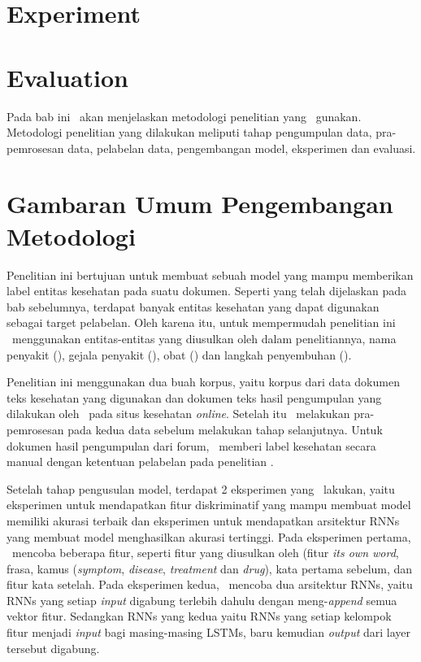 \section{Experiment}

\section{Evaluation}


Pada bab ini \saya~akan menjelaskan metodologi penelitian yang \saya~gunakan. Metodologi penelitian yang dilakukan meliputi tahap pengumpulan data, pra-pemrosesan data, pelabelan data, pengembangan model, eksperimen dan evaluasi.

\section{Gambaran Umum Pengembangan Metodologi}
Penelitian ini bertujuan untuk membuat sebuah model yang mampu memberikan label entitas kesehatan pada suatu dokumen. Seperti yang telah dijelaskan pada bab sebelumnya, terdapat banyak entitas kesehatan yang dapat digunakan sebagai target pelabelan. Oleh karena itu, untuk mempermudah penelitian ini \saya~menggunakan entitas-entitas yang diusulkan oleh \cite{skripsiKakRadit} dalam penelitiannya,  nama penyakit (\textit{\disease}), gejala penyakit (\textit{\symptom}), obat (\textit{\drug}) dan langkah penyembuhan (\textit{\treatment}).

Penelitian ini menggunakan dua buah korpus, yaitu korpus dari data dokumen teks kesehatan yang digunakan \cite{skripsiKakRadit} dan dokumen teks hasil pengumpulan yang dilakukan oleh \saya~pada situs kesehatan \textit{online}. Setelah itu \saya~melakukan pra-pemrosesan pada kedua data sebelum melakukan tahap selanjutnya. Untuk dokumen hasil pengumpulan dari forum, \saya~memberi label kesehatan secara manual dengan ketentuan pelabelan pada penelitian \cite{skripsiKakRadit}.

Setelah tahap pengusulan model, terdapat 2 eksperimen yang \saya~lakukan, yaitu eksperimen untuk mendapatkan fitur diskriminatif yang mampu membuat model memiliki akurasi terbaik dan eksperimen untuk mendapatkan arsitektur RNNs yang membuat model menghasilkan akurasi tertinggi. Pada eksperimen pertama, \saya~mencoba beberapa fitur, seperti fitur yang diusulkan oleh \cite{skripsiKakRadit} (fitur \textit{its own word}, frasa, kamus (\textit{symptom}, \textit{disease}, \textit{treatment} dan \textit{drug}), kata pertama sebelum, dan fitur kata setelah. Pada eksperimen kedua, \saya~mencoba dua arsitektur RNNs, yaitu RNNs yang setiap \textit{input} digabung terlebih dahulu dengan meng-\textit{append} semua vektor fitur. Sedangkan RNNs yang kedua yaitu RNNs yang setiap kelompok fitur menjadi \textit{input} bagi masing-masing LSTMs, baru kemudian \textit{output} dari layer tersebut digabung.

